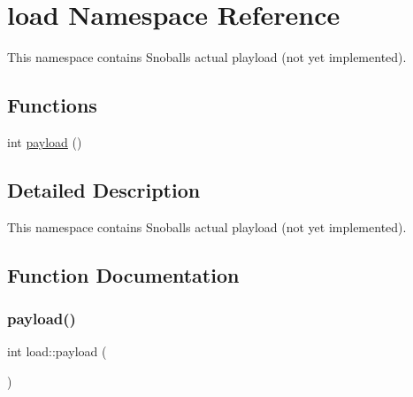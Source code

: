 \hypertarget{namespaceload}{}\section{load Namespace Reference}
\label{namespaceload}


This namespace contains Snoball\textquotesingle{}s actual playload (not yet implemented).  


\subsection*{Functions}
\begin{DoxyCompactItemize}
\item 
int \hyperlink{namespaceload_aa47dbb4f220ece6da0a0cf7d43deaa6f}{payload} ()
\end{DoxyCompactItemize}


\subsection{Detailed Description}
This namespace contains Snoball\textquotesingle{}s actual playload (not yet implemented). 

\subsection{Function Documentation}
\mbox{\label{namespaceload_aa47dbb4f220ece6da0a0cf7d43deaa6f}} 
\subsubsection{\texorpdfstring{payload()}{payload()}}
{\footnotesize\ttfamily int load\+::payload (\begin{DoxyParamCaption}{ }\end{DoxyParamCaption})}

